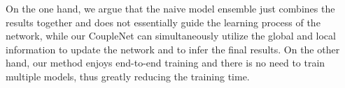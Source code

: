 \documentclass[10pt,twocolumn,letterpaper]{article}
\begin{document}
\begin{table}[htb]
\begin{center}
\end{center}
\caption{\textbf{CoupleNet \textit{vs.} model ensemble.} \textit{ReIm}: our reimplementation using OHEM. Global FCN: only the global branch of our network.}
\label{Model ensembling}
\end{table}

On the one hand, we argue that the naive model ensemble just combines the results together and does not essentially guide the learning process of the network, while our CoupleNet can simultaneously utilize the global and local information to update the network and to infer the final results. On the other hand, our method enjoys end-to-end training and there is no need to train multiple models, thus greatly reducing the training time.
\end{document}
